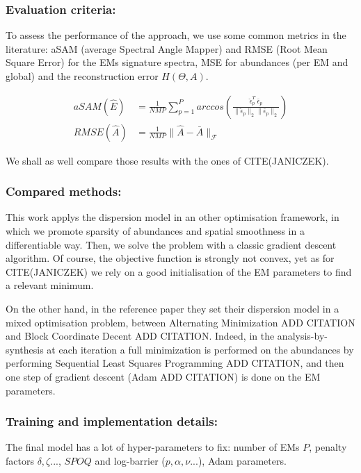 \documentclass{article}
\begin{document}
\subsubsection{Evaluation criteria:}
To assess the performance of the approach, we use some common metrics in the literature: aSAM (average Spectral Angle Mapper) and RMSE (Root Mean Square Error) for the EMs signature spectra, MSE for abundances (per EM and global) and the reconstruction error $H(\Theta, A)$.

\begin{align*}
  aSAM(\widehat{E}) &= \frac{1}{N M P} \sum_{p=1}^P arccos \left( \frac{\widehat{\epsilon}_p^T\ \bar{\epsilon}_p}{\| \widehat{\epsilon}_p \|_2 \| \bar{\epsilon}_p \|_2} \right)\\
  RMSE(\widehat{A}) &= \frac{1}{N M P} \| \widehat{A} - \bar{A} \|_{\mathcal{F}}
\end{align*}

We shall as well compare those results with the ones of CITE(JANICZEK).

\subsubsection{Compared methods:}
This work applys the dispersion model in an other optimisation framework, in which we promote sparsity of abundances and spatial smoothness in a differentiable way. Then, we solve the problem with a classic gradient descent algorithm. Of course, the objective function is strongly not convex, yet as for CITE(JANICZEK) we rely on a good initialisation of the EM parameters to find a relevant minimum.

On the other hand, in the reference paper they set their dispersion model in a mixed optimisation problem, between Alternating Minimization ADD CITATION and Block Coordinate Decent ADD CITATION. Indeed, in the analysis-by-synthesis at each iteration a full minimization is performed on the abundances by performing Sequential Least Squares Programming ADD CITATION, and then one step of gradient descent (Adam ADD CITATION) is done on the EM parameters.

\subsubsection{Training and implementation details:}
The final model has a lot of hyper-parameters to fix: number of EMs $P$, penalty factors $\delta, \zeta...$, $SPOQ$ and log-barrier ($p, \alpha, \nu...$), Adam parameters.
\end{document}
